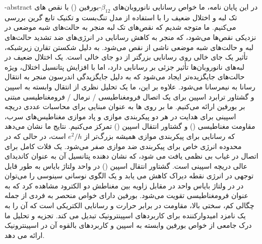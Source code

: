 % 
% 
% 
% 
% 
% 
\fa-abstract{
    در این پایان نامه، ما خواص رسانایی نانوروبان‌های $\beta_{12}$-بورفین () با نقص های تک لبه و اختلال ضعیف را با استفاده از مدل تنگ‌بست و تکنیک تابع گرین بررسی می‌کنیم. ما متوجه شدیم که نقص‌های تک لبه منجر به حالت‌های شبه موضعی در نزدیکی نقص‌ها می‌شود، که منجر به کاهش رسانایی در انرژی‌های ضد تشدید حالت‌های لبه و حالت‌های شبه موضعی ناشی از نقص می‌شود. به دلیل شکستن تقارن زیرشبکه، تأثیر یک جای خالی روی رسانایی بزرگتر از دو جای خالی است. یک اختلال ضعیف در لبه‌های نانوروبان‌ها تأثیر جزئی بر رسانایی دارد، اما با افزایش پتانسیل اختلال، ویژه حالت‌های جایگزیده‌تر ایجاد می‌شود که به دلیل جایگزیدگی اندرسون منجر به انتقال رسانا به نیمرسانا می‌شود. علاوه بر این، ما یک تحلیل نظری از انتقال وابسته به اسپین و گشتاور ترابرد اسپین برای یک اتصال فرومغناطیسی / نرمال / فرومغناطیسی مبتنی بر بورفین ارائه می‌کنیم. ما بر روی ها به عنوان مبنایی برای محاسبات عددی دریچه اسپینی برای هدایت در هر دو پیکربندی موازی و پاد موازی مغناطیس‌های سرب، مقاومت مغناطیسی () و گشتاور انتقال اسپین () تمرکز می‌کنیم. نتایج ما نشان می‌دهد که رسانایی برای پیکربندی موازی همیشه بزرگ‌تر از $e^2/h$ است، در حالی که در محدوده انرژی خاص برای پیکربندی ضد موازی صفر می‌شود. یک فلات  کامل برای اتصال در غیاب بی نظمی یافت می شود، که نشان دهنده پتانسیل آن به عنوان کاندیدای عالی دریچه اسپینی است. گشتاور انتقال اسپین () در واحد ولتاژ بایاس به طور قابل توجهی در انرژی نقطه دیراک کاهش می یابد و یک الگوی نوسانی سینوسی را می‌توان در  در ولتاژ بایاس واحد در مقابل زاویه بین مغناطش دو الکترود مشاهده کرد که به عنوان فرومغناطیسی تقویت می‌شود. بورفین دارای خواص منحصر به فردی از جمله چگالی کم، سختی بالا، مقاومت در برابر حرارت و رسانایی الکتریکی است که آن را به یک نامزد امیدوارکننده برای کاربردهای اسپینترونیک تبدیل می کند. تجزیه و تحلیل ما درک جامعی از خواص بورفین وابسته به اسپین و کاربردهای بالقوه آن در اسپینترونیک ارائه می دهد.
}

\abstractPage

\newpage\clearpage